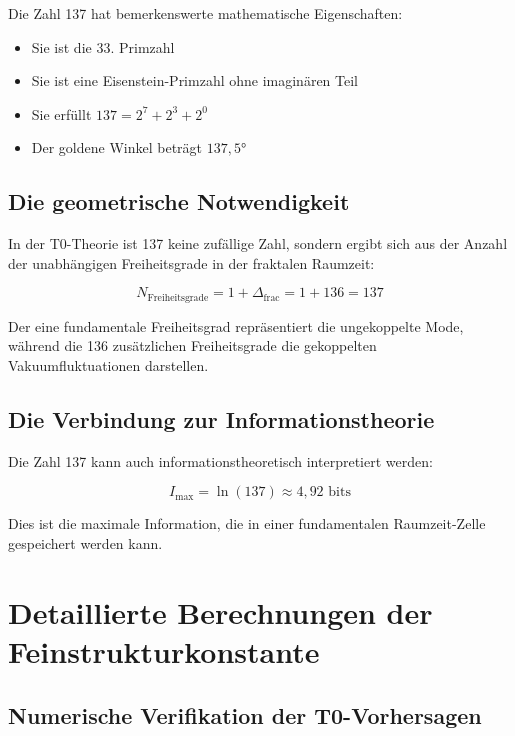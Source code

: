 \documentclass[12pt,a4paper]{article}
\theoremstyle{definition}
\begin{document}
	Die Zahl 137 hat bemerkenswerte mathematische Eigenschaften:
	
	\begin{itemize}
		\item Sie ist die 33. Primzahl
		\item Sie ist eine Eisenstein-Primzahl ohne imaginären Teil
		\item Sie erfüllt $137 = 2^7 + 2^3 + 2^0$
		\item Der goldene Winkel beträgt $137{,}5°$
	\end{itemize}
	
	\subsection{Die geometrische Notwendigkeit}
	
	In der T0-Theorie ist 137 keine zufällige Zahl, sondern ergibt sich aus der Anzahl der unabhängigen Freiheitsgrade in der fraktalen Raumzeit:
	
	\begin{equation}
		N_{\text{Freiheitsgrade}} = 1 + \Delta_{\text{frac}} = 1 + 136 = 137
	\end{equation}
	
	Der eine fundamentale Freiheitsgrad repräsentiert die ungekoppelte Mode, während die 136 zusätzlichen Freiheitsgrade die gekoppelten Vakuumfluktuationen darstellen.
	
	\subsection{Die Verbindung zur Informationstheorie}
	
	Die Zahl 137 kann auch informationstheoretisch interpretiert werden:
	
	\begin{equation}
		I_{\text{max}} = \ln(137) \approx 4{,}92 \text{ bits}
	\end{equation}
	
	Dies ist die maximale Information, die in einer fundamentalen Raumzeit-Zelle gespeichert werden kann.
	
	\section{Detaillierte Berechnungen der Feinstrukturkonstante}
	
	\subsection{Numerische Verifikation der T0-Vorhersagen}
	
\end{document}
